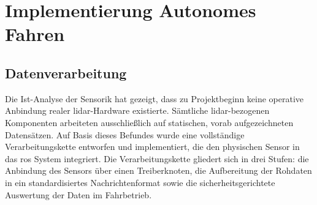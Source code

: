 \section{Implementierung Autonomes Fahren}
\label{sec:implementierung_autonomes_fahren}
\subsection{Datenverarbeitung}
\label{sec:datenverarbeitung_sonia}
Die Ist-Analyse der Sensorik hat gezeigt, dass zu Projektbeginn keine operative Anbindung realer \gls{lidar}-Hardware existierte. Sämtliche \gls{lidar}-bezogenen Komponenten arbeiteten ausschließlich auf statischen, vorab aufgezeichneten Datensätzen. Auf Basis dieses Befundes wurde eine vollständige Verarbeitungskette entworfen und implementiert, die den physischen Sensor in das \gls{ros} System \cite{macenski2022ros2} integriert. Die Verarbeitungskette gliedert sich in drei Stufen: die Anbindung des Sensors über einen Treiberknoten, die Aufbereitung der Rohdaten in ein standardisiertes Nachrichtenformat sowie die sicherheitsgerichtete Auswertung der Daten im Fahrbetrieb.


